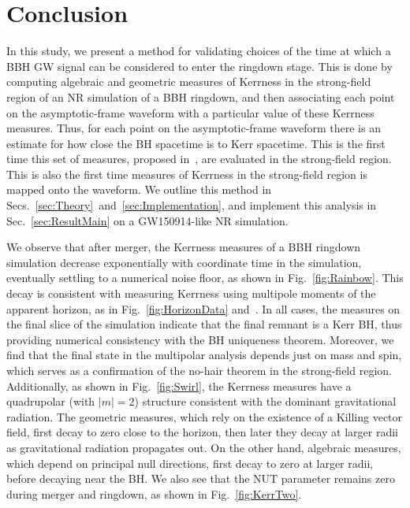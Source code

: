 \section{Conclusion}
\label{sec:Conclusion}



In this study, we present a method for validating choices of
the time at which a BBH GW signal can be considered to enter the ringdown stage. This is done by computing algebraic and geometric measures of Kerrness in the strong-field region of an NR simulation of a BBH ringdown, and then associating each point on the asymptotic-frame waveform with a particular value of these Kerrness measures. Thus, for each point on the asymptotic-frame waveform there is an estimate for how close the BH spacetime is to Kerr spacetime. This is the first time this set of measures, proposed in~\cite{lobo16}, are evaluated in the strong-field region. This is also the first time measures of Kerrness in the strong-field region is mapped onto the waveform.  We outline this method in Secs.~\ref{sec:Theory}~and~\ref{sec:Implementation}, and implement this analysis in Sec.~\ref{sec:ResultMain} on a GW150914-like NR simulation. 

We observe that after merger, the Kerrness measures of a BBH ringdown simulation decrease exponentially with coordinate time in the simulation, eventually settling to a numerical noise floor, as shown in Fig.~\ref{fig:Rainbow}. This decay is consistent with measuring Kerrness using multipole moments of the apparent horizon, as in Fig.~\ref{fig:HorizonData} and~\cite{Owen:2009sb}. In all cases, the measures on the final slice of the simulation indicate that the final remnant is a Kerr BH, thus providing numerical consistency with the BH uniqueness theorem. Moreover, we find that the final state in the multipolar analysis depends just on mass and spin, which serves as a confirmation of the no-hair theorem in the strong-field region. Additionally, as shown in Fig.~\ref{fig:Swirl}, the Kerrness measures have a quadrupolar (with $|m| = 2$) structure consistent with the dominant gravitational radiation. The geometric measures, which rely on the existence of a Killing vector field, first decay to zero close to the horizon, then later they decay at larger radii as gravitational radiation propagates out. On the other hand, algebraic measures, which depend on principal null directions, first decay to zero at larger radii, before decaying near the BH. We also see that  the NUT parameter remains zero during merger and ringdown,
as shown in Fig.~\ref{fig:KerrTwo}. 

